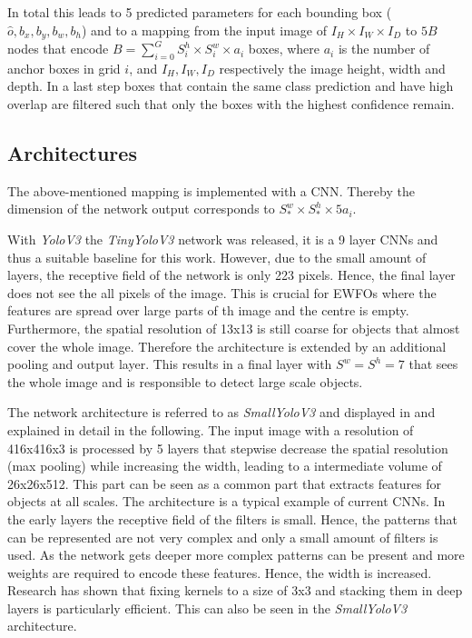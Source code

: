 In total this leads to 5 predicted parameters for each bounding box ($\hat o,b_x,b_y,b_w,b_h$) and to a mapping from the input image of $I_H\times I_W\times I_D$ to $5B$ nodes that encode $B=\sum_{i=0}^{G}S^h_i\times S^w_i\times a_i$ boxes, where $a_i$ is the number of anchor boxes in grid $i$, and $I_H, I_W, I_D$ respectively the image height, width and depth. In a last step boxes that contain the same class prediction and have high overlap are filtered such that only the boxes with the highest confidence remain. 

\subsection{Architectures}

The above-mentioned mapping is implemented with a \ac{CNN}. Thereby the dimension of the network output corresponds to $S^w_*\times S^h_*\times 5a_i$.

With \textit{YoloV3} the \textit{TinyYoloV3} network was released, it is a 9 layer \acp{CNN} and thus a suitable baseline for this work. However, due to the small amount of layers, the receptive field of the network is only 223 pixels. Hence, the final layer does not see the all pixels of the image. This is crucial for \acp{EWFO} where the features are spread over large parts of th image and the centre is empty. Furthermore, the spatial resolution of 13x13 is still coarse for objects that almost cover the whole image. Therefore the architecture is extended by an additional pooling and output layer. This results in a final layer with $S^w = S^h = 7$ that sees the whole image and is responsible to detect large scale objects. 

The network architecture is referred to as \textit{SmallYoloV3} and displayed in  and explained in detail in the following. The input image with a resolution of 416x416x3 is processed by 5 layers that stepwise decrease the spatial resolution (max pooling) while increasing the width, leading to a intermediate volume of 26x26x512. This part can be seen as a common part that extracts features for objects at all scales. The architecture is a typical example of current \acp{CNN}. In the early layers the receptive field of the filters is small. Hence, the patterns that can be represented are not very complex and only a small amount of filters is used. As the network gets deeper more complex patterns can be present and more weights are required to encode these features. Hence, the width is increased. Research has shown that fixing kernels to a size of 3x3 and stacking them in deep layers is particularly efficient\cite{SimonyanZ14a}. This can also be seen in the \textit{SmallYoloV3} architecture. 

